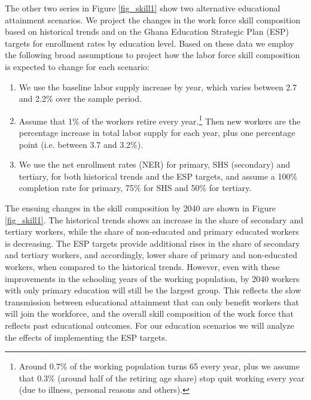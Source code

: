 \documentclass[11pt,english]{article}
\begin{document}
The other two series in Figure \ref{fig_skill1} show two alternative educational attainment scenarios. We project the changes in the work force skill composition based on historical trends and on the Ghana Education Strategic Plan (ESP) targets for enrollment rates by education level. Based on these data we employ the following broad assumptions to project how the labor force skill composition is expected to change for each scenario: 
\begin{enumerate}
	\item We use the baseline labor supply increase by year, which varies between 2.7 and 2.2\% over the sample period.
	\item Assume that 1\% of the workers retire every year.\footnote{Around 0.7\% of the working population turns 65 every year, plus we assume that 0.3\% (around half of the retiring age share) stop quit working every year (due to illness, personal reasons and others).} Then new workers are the percentage increase in total labor supply for each year, plus one percentage point (i.e. between 3.7 and 3.2\%).
	\item We use the net enrollment rates (NER) for primary, SHS (secondary) and tertiary, for both historical trends and the ESP targets,  and assume a 100\% completion rate for primary, 75\% for SHS and 50\% for tertiary. 
\end{enumerate}

The ensuing changes in the skill composition by 2040 are shown in Figure \ref{fig_skill1}. The historical trends shows an increase in the share of secondary and tertiary workers, while the share of non-educated and primary educated workers is decreasing. The ESP targets provide additional rises in the share of secondary and tertiary workers, and accordingly, lower share of primary and non-educated workers, when compared to the historical trends. However, even with these improvements in the schooling years of the working population, by 2040 workers with only primary education will still be the largest group. This reflects the  slow transmission between educational attainment that can only benefit workers that will join the workforce, and the overall skill composition of the work force that reflects past educational outcomes. For our education scenarios we will analyze the effects of implementing the ESP targets.
\end{document}

